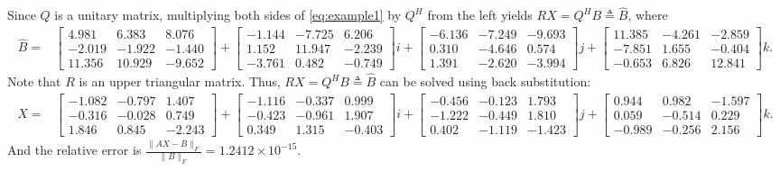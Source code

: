 \documentclass{book}
\makeatletter
\def\my@tag@font{\normalsize}
\let\amsmath@eqref\eqref
\renewcommand\eqref[1]{{\let\my@tag@font\relax\amsmath@eqref{#1}}}
\theoremstyle{remark}
\makeatother
\begin{document}
\begin{multicols}{2}
Since $Q$ is a unitary matrix, multiplying both sides of \eqref{eq:example1} by $Q^H$ from the left yields $RX = Q^HB\triangleq \widehat{B}$,
where
{\footnotesize
\begin{align*}
  \widehat{B} =
    & \begin{bmatrix}
     4.981  &  6.383  &  8.076 \\
    -2.019  & -1.922  & -1.440 \\
     11.356 &  10.929 & -9.652
    \end{bmatrix} +
    \begin{bmatrix}
    -1.144 & -7.725  &  6.206 \\
     1.152 &  11.947 & -2.239 \\
    -3.761 &  0.482  & -0.749
    \end{bmatrix} i +
    \begin{bmatrix}
    -6.136 & -7.249 & -9.693 \\
     0.310 & -4.646 &  0.574 \\
     1.391 & -2.620 & -3.994
    \end{bmatrix} j +
    \begin{bmatrix}
     11.385 & -4.261 & -2.859 \\
    -7.851  &  1.655 & -0.404 \\
    -0.653  &  6.826 &  12.841
    \end{bmatrix} k.
\end{align*}
}
Note that $R$ is an upper triangular matrix. Thus, $RX = Q^HB\triangleq \widehat{B}$ can be solved using back substitution:
{\footnotesize
 \begin{align*}
  X =
    & \begin{bmatrix}
    -1.082 & -0.797 &  1.407 \\
    -0.316 & -0.028 &  0.749 \\
     1.846 &  0.845 & -2.243
    \end{bmatrix} +
    \begin{bmatrix}
    -1.116 & -0.337 &  0.999 \\
    -0.423 & -0.961 &  1.907 \\
     0.349 &  1.315 & -0.403
    \end{bmatrix} i +
    \begin{bmatrix}
    -0.456 & -0.123 &  1.793 \\
    -1.222 & -0.449 &  1.810 \\
     0.402 & -1.119 & -1.423
    \end{bmatrix} j +
    \begin{bmatrix}
     0.944 &  0.982 & -1.597 \\
     0.059 & -0.514 &  0.229 \\
    -0.989 & -0.256 &  2.156
    \end{bmatrix} k.
\end{align*}
}
And the relative error is $\frac{\|AX - B\|_F}{\|B\|_F} = 1.2412\times 10^{-15}$.


\end{multicols}
\end{document}
